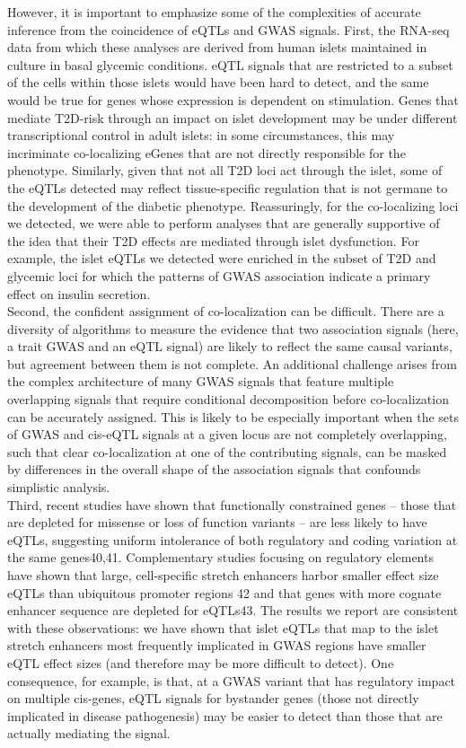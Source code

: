 However, it is important to emphasize some of the complexities of accurate inference from the coincidence of eQTLs and GWAS signals. First, the RNA-seq data from which these analyses are derived from human islets maintained in culture in basal glycemic conditions. eQTL signals that are restricted to a subset of the cells within those islets would have been hard to detect, and the same would be true for genes whose expression is dependent on stimulation. Genes that mediate T2D-risk through an impact on islet development may be under different transcriptional control in adult islets: in some circumstances, this may incriminate co-localizing eGenes that are not directly responsible for the phenotype. Similarly, given that not all T2D loci act through the islet, some of the eQTLs detected may reflect tissue-specific regulation that is not germane to the development of the diabetic phenotype. Reassuringly, for the co-localizing loci we detected, we were able to perform analyses that are generally supportive of the idea that their T2D effects are mediated through islet dysfunction. For example, the islet eQTLs we detected were enriched in the subset of T2D and glycemic loci for which the patterns of GWAS association indicate a primary effect on insulin secretion.\\   
Second, the confident assignment of co-localization can be difficult. There are a diversity of algorithms to measure the evidence that two association signals (here, a trait GWAS and an eQTL signal) are likely to reflect the same causal variants, but agreement between them is not complete. An additional challenge arises from the complex architecture of many GWAS signals that feature multiple overlapping signals that require conditional decomposition before co-localization can be accurately assigned. This is likely to be especially important when the sets of GWAS and cis-eQTL signals at a given locus are not completely overlapping, such that clear co-localization at one of the contributing signals, can be masked by differences in the overall shape of the association signals that confounds simplistic analysis. \\   
Third, recent studies have shown that functionally constrained genes – those that are depleted for missense or loss of function variants – are less likely to have eQTLs, suggesting uniform intolerance of both regulatory and coding variation at the same genes40,41. Complementary studies focusing on regulatory elements have shown that large, cell-specific stretch enhancers harbor smaller effect size eQTLs than ubiquitous promoter regions 42 and that genes with more cognate enhancer sequence are depleted for eQTLs43. The results we report are consistent with these observations: we have shown that islet eQTLs that map to the islet stretch enhancers most frequently implicated in GWAS regions have smaller eQTL effect sizes (and therefore may be more difficult to detect). One consequence, for example, is that, at a GWAS variant that has regulatory impact on multiple cis-genes, eQTL signals for bystander genes (those not directly implicated in disease pathogenesis) may be easier to detect than those that are actually mediating the signal. \\
